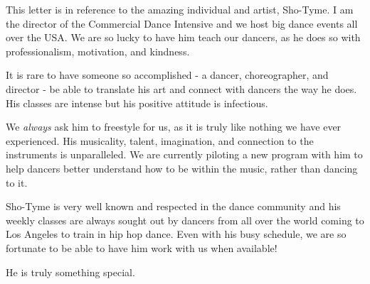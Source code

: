 \documentclass[10pt,stdletter]{newlfm}
\begin{document}
\begin{newlfm}

This letter is in reference to the amazing individual and artist, Sho-Tyme. I am the director of the Commercial Dance Intensive and we host big dance events all over the USA. We are so lucky to have him teach our dancers, as he does so with professionalism, motivation, and kindness.

It is rare to have someone so accomplished - a dancer, choreographer, and director - be able to translate his art and connect with dancers the way he does. His classes are intense but his positive attitude is infectious.

We \textit{always} ask him to freestyle for us, as it is truly like nothing we have ever experienced. His musicality, talent, imagination, and connection to the instruments is unparalleled. We are currently piloting a new program with him to help dancers better understand how to be within the music, rather than dancing to it.

Sho-Tyme is very well known and respected in the dance community and his weekly classes are always sought out by dancers from all over the world coming to Los Angeles to train in hip hop dance. Even with his busy schedule, we are so fortunate to be able to have him work with us when available!

He is truly something special.

\end{newlfm}
\end{document}
